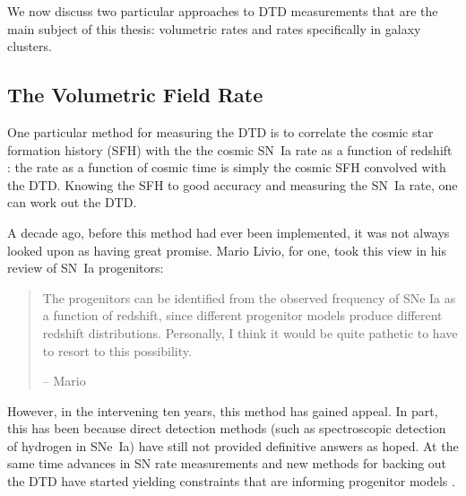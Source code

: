 We now discuss two particular approaches to DTD measurements that are
the main subject of this thesis: volumetric rates and rates
specifically in galaxy clusters.




\subsection{The Volumetric Field Rate}

One particular method for measuring the DTD is to correlate the cosmic
star formation history (SFH) with the the cosmic SN~Ia rate as a
function of redshift \citep{yungelson00a}: the rate as a function of
cosmic time is simply the cosmic SFH convolved with the DTD. Knowing
the SFH to good accuracy and measuring the SN~Ia rate, one can work
out the DTD.

A decade ago, before this method had ever been implemented, it was not
always looked upon as having great promise. Mario Livio, for one, took
this view in his review of SN~Ia progenitors:
\begin{quote}
The progenitors can be identified from the observed frequency of SNe
Ia as a function of redshift, since different progenitor models
produce different redshift distributions. Personally, I think it would
be quite pathetic to have to resort to this possibility.
\begin{flushright}
-- Mario \citet{livio01a}
\end{flushright}
\end{quote}
However, in the intervening ten years, this method has gained
appeal. In part, this has been because direct detection methods (such
as spectroscopic detection of hydrogen in SNe~Ia) have still not
provided definitive answers as hoped. At the same time advances in SN
rate measurements and new methods for backing out the DTD have started
yielding constraints that are informing progenitor models
\citep[e.g.][]{vankerkwijk10a}.

